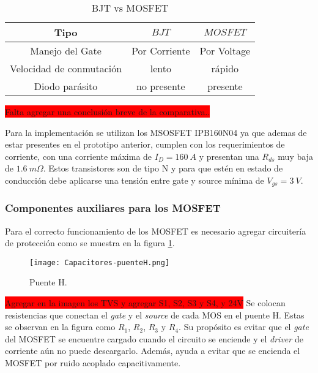\begin{table}[H]
	\begin{center}
		\begin{tabular}{| c | c | c |}
			\hline
			Tipo & $BJT$ & $MOSFET$\\ \hline
			Manejo del Gate & Por Corriente & Por Voltage \\ \hline 
			Velocidad de conmutación & lento & rápido \\ \hline 
			Diodo parásito & no presente & presente \\ \hline 
		\end{tabular}
		\caption{BJT vs MOSFET}
		\label{tab_MOSFETvsBJT}
	\end{center}
\end{table}

\colorbox{red}{Falta agregar una conclusión breve de la comparativa..}

Para la implementación se utilizan los MSOSFET IPB160N04 ya que ademas de estar presentes en el prototipo anterior, cumplen con los requerimientos de corriente, con una corriente máxima de $I_{D}=160\:A$ y presentan una $R_{ds}$ muy baja de $1.6 \:m \Omega$. Estos transistores son de tipo N y para que estén en estado de conducción debe aplicarse una tensión entre gate y source mínima de $V_{gs}= 3\:V$.

\subsubsection{Componentes auxiliares para los MOSFET} \label{sec_auxiliares_mosfet}


Para el correcto funcionamiento de los MOSFET es necesario agregar circuitería de protección como se muestra en la figura \ref{fig:img_capacitores-puenteH}.


\begin{figure}[H]
	\centering
	\texttt{[image: Capacitores-puenteH.png]}
	\caption{Puente H.}
	\label{fig:img_capacitores-puenteH}
\end{figure}

\colorbox{red}{Agregar en la imagen los TVS y agregar S1, S2, S3 y S4, y 24V}
\noindent Se colocan resistencias que conectan el \textsl{gate} y el \textsl{source} de cada MOS en el puente H. Estas se observan en la figura como $R_1$, $R_2$, $R_3$ y $R_4$. Su propósito es evitar que el \textsl{gate} del MOSFET se encuentre cargado cuando el circuito se enciende y el \textsl{driver} de corriente aún no puede descargarlo. Además, ayuda a evitar que se encienda el MOSFET por ruido acoplado capacitivamente. 

